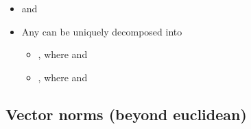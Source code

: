 \begin{itemize}
            \begin{itemize}

                  \item
                         and
                  \item
                        Any  can be uniquely decomposed
                        into

                        \begin{itemize}

                              \item
                                    , where
                                     and
                              \item
                                    , where
                                     and
                        \end{itemize}
            \end{itemize}
\end{itemize}

\subsection*{Vector norms (beyond euclidean)}

